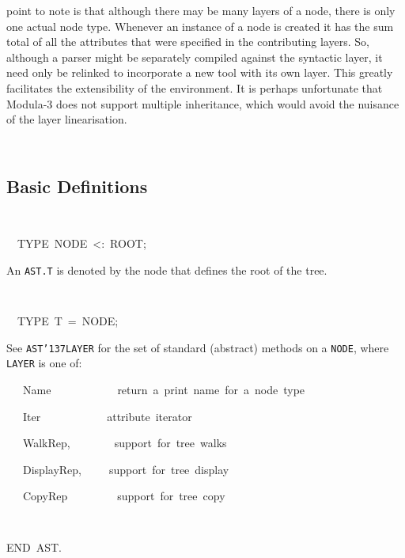 {{point to note is that although there may be many layers of a node,
there is only one actual node type. Whenever an instance of a node is
created it has the sum total of all the attributes that were specified
in the contributing layers. So, although a parser might be separately
compiled against the syntactic layer, it need only be relinked to
incorporate a new tool with its own layer. This greatly facilitates
the extensibility of the environment. It is perhaps unfortunate that
Modula-3 does not support multiple inheritance, which would avoid the
nuisance of the layer linearisation.  \par}\par{\tt\parskip=0pt\parindent=0pt\progmode
}\par\medskip\noindent
{\rm  \subsection{Basic Definitions} \par}\par{\tt\parskip=0pt\parindent=0pt\progmode
\par\medskip \par\medskip
\tab ~~TYPE~NODE~<:~ROOT;}\par\medskip\noindent
{\rm  An {\tt AST.T} is denoted by the node that defines the root of the tree. \par}\par{\tt\parskip=0pt\parindent=0pt\progmode
\par\medskip \par\medskip
\tab ~~TYPE~T~=~NODE;}\par\medskip\noindent
{\rm  See {\tt AST\char'137{}LAYER} for the set of standard (abstract) methods on a {\tt NODE},
   where {\tt LAYER} is one of:
   \par
\par{}\noindent\par
{\display ~~~Name~~~~~~~~~~~~return~a~print~name~for~a~node~type}\noindent\par
{\display ~~~Iter~~~~~~~~~~~~attribute~iterator}\noindent\par
{\display ~~~WalkRep,~~~~~~~~support~for~tree~walks}\noindent\par
{\display ~~~DisplayRep,~~~~~support~for~tree~display}\noindent\par
{\display ~~~CopyRep~~~~~~~~~support~for~tree~copy}\noindent\par
\par}\par{\tt\parskip=0pt\parindent=0pt\progmode
\par\medskip \par\medskip
\tab END~AST.}\par\medskip\noindent

}
